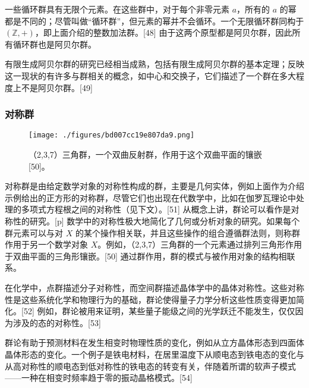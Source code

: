 一些循环群具有无限个元素。在这些群中，对于每个非零元素 \(a\)，所有的 \(a\) 的幂都是不同的；尽管叫做“循环群”，但元素的幂并不会循环。一个无限循环群同构于 \((\mathbb{Z}, +)\)，即上面介绍的整数加法群。[48] 由于这两个原型都是阿贝尔群，因此所有循环群也是阿贝尔群。

有限生成阿贝尔群的研究已经相当成熟，包括有限生成阿贝尔群的基本定理；反映这一现状的有许多与群相关的概念，如中心和交换子，它们描述了一个群在多大程度上不是阿贝尔群。[49]
\subsubsection{对称群}
\begin{figure}[ht]
\centering
\texttt{[image: ./figures/bd007cc19e807da9.png]}
\caption{（2,3,7）三角群，一个双曲反射群，作用于这个双曲平面的镶嵌[50]。} \label{fig_GroupM_7}
\end{figure}
对称群是由给定数学对象的对称性构成的群，主要是几何实体，例如上面作为介绍示例给出的正方形的对称群，尽管它们也出现在代数学中，比如在伽罗瓦理论中处理的多项式方程根之间的对称性（见下文）。[51] 从概念上讲，群论可以看作是对称性的研究。[p] 数学中的对称性极大地简化了几何或分析对象的研究。如果每个群元素可以与对 \(X\) 的某个操作相关联，并且这些操作的组合遵循群法则，则称群作用于另一个数学对象 \(X\)。例如，（2,3,7）三角群的一个元素通过排列三角形作用于双曲平面的三角形镶嵌。[50] 通过群作用，群的模式与被作用对象的结构相联系。

在化学中，点群描述分子对称性，而空间群描述晶体学中的晶体对称性。这些对称性是这些系统化学和物理行为的基础，群论使得量子力学分析这些性质变得更加简化。[52] 例如，群论被用来证明，某些量子能级之间的光学跃迁不能发生，仅仅因为涉及的态的对称性。[53]

群论有助于预测材料在发生相变时物理性质的变化，例如从立方晶体形态到四面体晶体形态的变化。一个例子是铁电材料，在居里温度下从顺电态到铁电态的变化与从高对称性的顺电态到低对称性的铁电态的转变有关，伴随着所谓的软声子模式——一种在相变时频率趋于零的振动晶格模式。[54]

